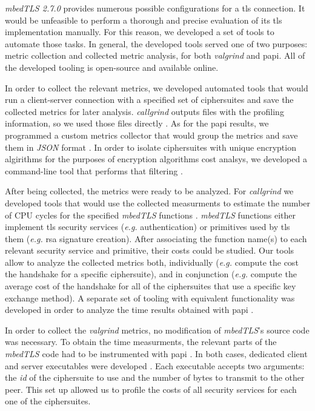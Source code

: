 \textit{mbedTLS 2.7.0} provides numerous possible configurations for a \gls{tls} connection. It would be unfeasible to
perform a thorough and precise evaluation of its \gls{tls} implementation manually. For this reason, we developed a set
of tools to automate those tasks. In general, the developed tools served one of two purposes: metric collection and
collected metric analysis, for both \textit{valgrind} and \gls{papi}. All of the developed tooling is open-source
and available online.

In order to collect the relevant metrics, we developed automated tools that would run a client-server connection with a specified set
of ciphersuites and save the collected metrics for later analysis. \textit{callgrind} outputs files with the profiling information,
so we used those files directly \cite{iluxonch23:online}. As for the \gls{papi} results, we programmed a custom metrics collector that 
would group the metrics and save them in \textit{JSON} format \cite{iluxonch67:online}. In order to isolate ciphersuites with unique encryption
algirithms for the purposes of encryption algorithms cost analsys, we developed a command-line tool
that performs that filtering \cite{iluxonch73:online}.

After being collected, the metrics were ready to be analyzed. For \textit{callgrind} we developed tools that would use the collected 
measurments to estimate the number of CPU cycles for the specified \textit{mbedTLS} functions \cite{iluxonch23:online} \cite{iluxonch44:online}. 
\textit{mbedTLS} functions either implement \gls{tls} security services
(\textit{e.g.} authentication) or primitives used by \gls{tls} them (\textit{e.g.} \gls{rsa} signature creation).
After associating the function name(s) to each relevant security service and primitive, their costs could be studied. 
Our tools allow to analyze the collected metrics both, individually (\textit{e.g.} compute the cost the handshake for a specific ciphersuite), and in conjunction (\textit{e.g.}
compute the average cost of the handshake for all of the ciphersuites that use a specific key exchange method).
A separate set of tooling with equivalent functionality was developed in order to analyze the time results obtained with \gls{papi} \cite{iluxonch67:online}.

In order to collect the \textit{valgrind} metrics, no modification of \textit{mbedTLS}'s source code was necessary. To obtain the time measurments, the relevant
parts of the \textit{mbedTLS} code had to be instrumented with \gls{papi} \cite{iluxonch24:online}. In both cases, dedicated client and server
executables were developed \cite{iluxonch24:online}. Each executable accepts two arguments: the \textit{id} of the ciphersuite to use and the number of bytes to transmit to the other
peer. This set up allowed us to profile the costs of all security services for each one of the ciphersuites.

